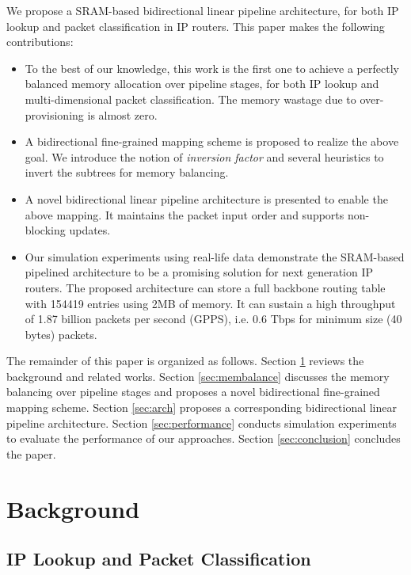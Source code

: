 \documentclass{sigcomm-alternate}
\begin{document}
We propose a SRAM-based bidirectional linear pipeline architecture, for both IP lookup and packet classification in IP routers. This paper makes the following contributions:
\begin{itemize}
\item To the best of our knowledge, this work is the first one to achieve a perfectly balanced memory allocation over pipeline stages, for both IP lookup and multi-dimensional packet classification. The memory wastage due to over-provisioning is almost zero.
\item A bidirectional fine-grained mapping scheme is proposed to realize the above goal. We introduce the notion of \textit{inversion factor} and several heuristics to invert the subtrees for memory balancing. \item A novel bidirectional linear pipeline architecture is presented to enable the above mapping. It maintains the packet input order and supports non-blocking updates.
\item Our simulation experiments using real-life data demonstrate the SRAM-based pipelined architecture to be a promising solution for next generation IP routers. The proposed architecture can store a full backbone routing table with 154419 entries using 2MB of memory. It can sustain a high throughput of 1.87 billion packets per second (GPPS), i.e. 0.6 Tbps for minimum size (40 bytes) packets.
\end{itemize}

The remainder of this paper is organized as follows. Section \ref{sec:bg} reviews the background and related works. Section \ref{sec:membalance} discusses the memory balancing over pipeline stages and proposes a novel bidirectional fine-grained mapping scheme. Section \ref{sec:arch} proposes a corresponding bidirectional linear pipeline architecture. Section \ref{sec:performance} conducts simulation experiments to evaluate the performance of our approaches. Section \ref{sec:conclusion} concludes the paper.

\section{Background}
\label{sec:bg}

\subsection{IP Lookup and Packet Classification}
\end{document}
